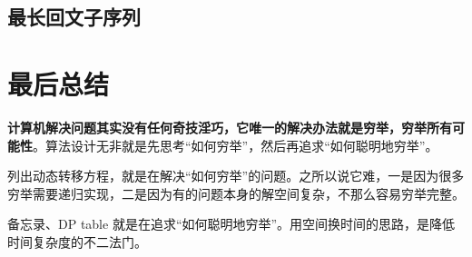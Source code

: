 \documentclass[12pt]{article}
\begin{document}
\subsection{最长回文子序列}



\section{最后总结}
\textbf{计算机解决问题其实没有任何奇技淫巧，它唯一的解决办法就是穷举，穷举所有可能性}。算法设计无非就是先思考“如何穷举”，然后再追求“如何聪明地穷举”。

列出动态转移方程，就是在解决“如何穷举”的问题。之所以说它难，一是因为很多穷举需要递归实现，二是因为有的问题本身的解空间复杂，不那么容易穷举完整。

备忘录、DP table 就是在追求“如何聪明地穷举”。用空间换时间的思路，是降低时间复杂度的不二法门。



\end{document}

